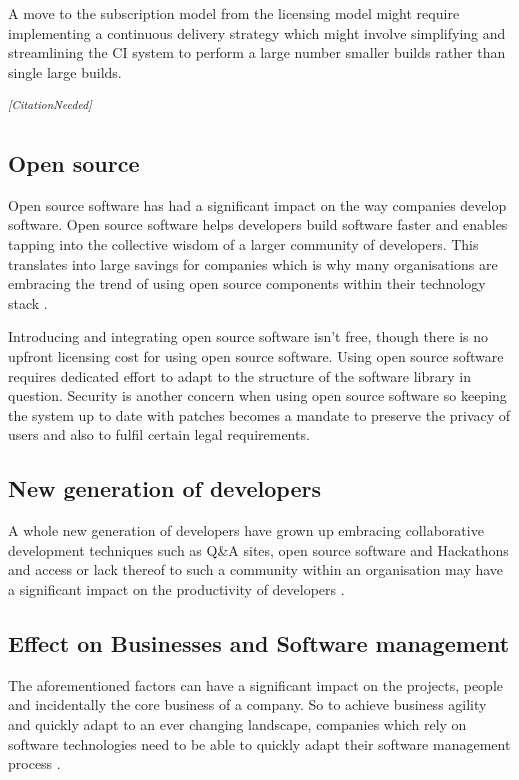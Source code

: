 \documentclass[12pt,conference]{IEEEtran}
\newcommand{\citationneeded}{\textsuperscript{\textit{[CitationNeeded]}}}
\begin{document}
A move to the subscription model from the licensing model might require implementing a continuous delivery strategy which might involve simplifying and streamlining the CI system to perform a large number smaller builds rather than single large builds.

\citationneeded

\subsection*{Open source}

Open source software has had a significant impact on the way companies develop software. Open source software helps developers build software faster and enables tapping into the collective wisdom of a larger community of developers. This translates into large savings for companies which is why many organisations are embracing the trend of using open source components within their technology stack \cite{baldwin_4_2014} \cite{lemmens_open_2008}.

Introducing and integrating open source software isn't free, though there is no upfront licensing cost for using open source software. Using open source software requires dedicated effort to adapt to the structure of the software library in question. Security is another concern when using open source software so keeping the system up to date with patches becomes a mandate to preserve the privacy of users and also to fulfil certain legal requirements.

\subsection*{New generation of developers}

A whole new generation of developers have grown up embracing collaborative development techniques such as Q\&A sites, open source software and Hackathons and access or lack thereof to such a community within an organisation may have a significant impact on the productivity of developers \cite{vasilescu_continuous_2014}. 


\subsection*{Effect on Businesses and Software management}

The aforementioned factors can have a significant impact on the projects, people and incidentally the core business of a company. So to achieve business agility and quickly adapt to an ever changing landscape, companies which rely on software technologies need to be able to quickly adapt their software management process \cite{mathiassen_business_2006}.
\end{document}
